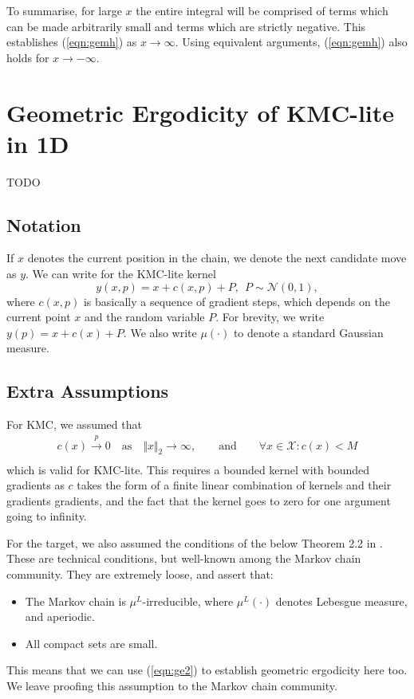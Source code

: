 \documentclass{article}
\newcommand{\X}{\mathcal{X}}
\begin{document}
To summarise, for large $x$ the entire integral will be comprised of terms which can be made arbitrarily small and terms which are strictly negative. This establishes (\ref{eqn:gemh}) as $x \to \infty$. Using equivalent arguments, (\ref{eqn:gemh}) also holds for $x \to -\infty$.

\section{Geometric Ergodicity of KMC-lite in 1D}
TODO
\subsection{Notation}

If $x$ denotes the current position in the chain, we denote the next candidate move as $y$.  We can write for the KMC-lite kernel
\[
y(x,p) = x + c(x,p) + P, ~~ P \sim \mathcal{N}(0,1),
\]
where $c(x,p)$ is basically a sequence of gradient steps, which depends on the current point $x$ and the random variable $P$.  For brevity, we write $y(p) = x + c(x) + P$.  We also write $\mu(\cdot)$ to denote a standard Gaussian measure.

\subsection{Extra Assumptions}

For KMC, we assumed that
\begin{align*}
c(x) \xrightarrow{p} 0 \quad\text{as}\quad \Vert x\Vert _2 \to \infty, \qquad\text{and}\qquad \forall x \in \X:  c(x) < M\\
\end{align*}
which is valid for KMC-lite. This requires a bounded kernel with bounded gradients as $c$ takes the form of a finite linear combination of kernels and their gradients gradients, and the fact that the kernel goes to zero for one argument going to infinity.

For the target, we also assumed the conditions of the below Theorem 2.2 in \cite{roberts1996geometric}.  These are technical conditions, but well-known among the Markov chain community.  They are extremely loose, and assert that:
\begin{itemize}
\item The Markov chain is $\mu^L$-irreducible, where $\mu^L(\cdot)$ denotes Lebesgue measure, and aperiodic.
\item All compact sets are small.
\end{itemize}
This means that we can use (\ref{eqn:ge2}) to establish geometric ergodicity here too. We leave proofing this assumption to the Markov chain community.
\end{document}
